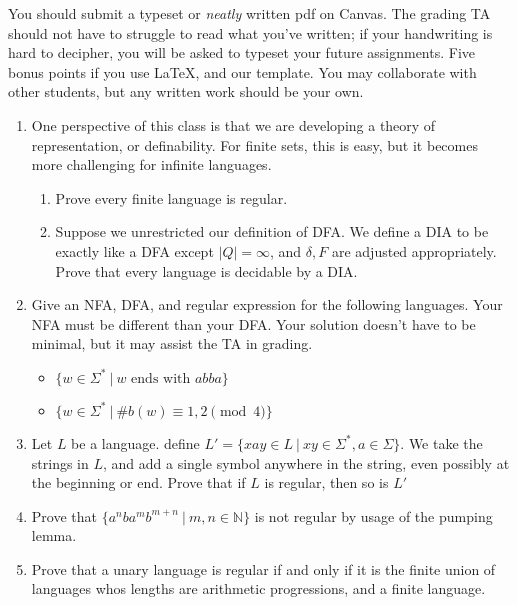 \documentclass[11pt]{article}
\begin{document}

You should submit a typeset or \emph{neatly} written pdf on Canvas.  The grading TA should not have to struggle to read what you've written; if your handwriting is hard to decipher, you will be asked to typeset your future assignments. Five bonus points if you use \LaTeX, and our template. You may collaborate with other students, but any written work should be your own.


\begin{enumerate}

    \item

    One perspective of this class is that we are developing a theory of representation, or definability. For finite sets, this is easy, but it becomes more challenging for infinite languages.

    \begin{enumerate}
        \item Prove every finite language is regular.
        \item Suppose we unrestricted our definition of DFA. We define a DIA to be exactly like a DFA except $|Q|=\infty$, and $\delta, F$ are adjusted appropriately. Prove that every language is decidable by a DIA.
    \end{enumerate}

    \item Give an NFA, DFA, and regular expression for the following languages. Your NFA must be different than your DFA. Your solution doesn't have to be minimal, but it may assist the TA in grading.
    \begin{itemize}
        \item $\{w \in \Sigma^* ~|~ w\text{ ends with } abba\}$
        \item $\{w \in \Sigma^* ~|~ \#b(w) \equiv 1,2 \pmod 4\}$
    \end{itemize}

    \item Let $L$ be a language. define $L' = \{xay \in L~|~ xy \in \Sigma^*, a \in \Sigma\}$. We take the strings in $L$, and add a single symbol anywhere in the string, even possibly at the beginning or end. Prove that if $L$ is regular, then so is $L'$

    \item Prove that $\{a^nba^mb^{m+n} ~|~ m,n \in \mathbb{N}\}$ is not regular by usage of the pumping lemma.

    \item Prove that a unary language is regular if and only if it is the finite union of languages whos lengths are arithmetic progressions, and a finite language.
\end{enumerate}
\end{document}
